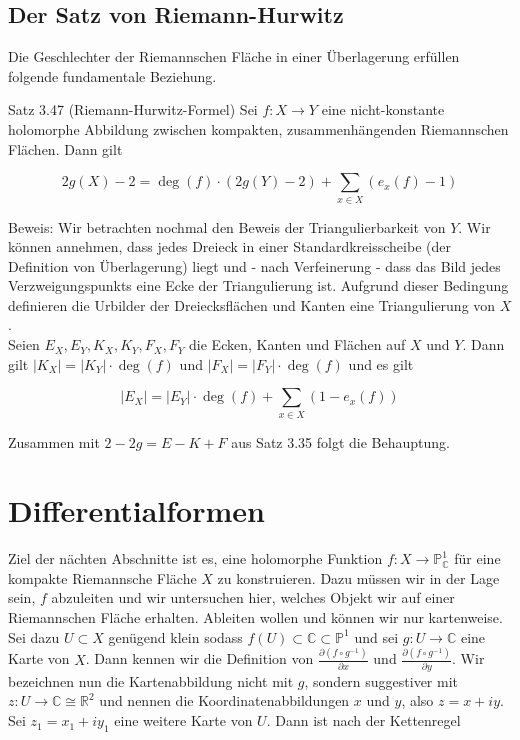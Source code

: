\documentclass[10pt, letterpaper]{article}
\begin{document}
\pagebreak

\subsection {Der Satz von Riemann-Hurwitz}
Die Geschlechter der Riemannschen Fläche in einer Überlagerung erfüllen folgende fundamentale Beziehung.

Satz 3.47 (Riemann-Hurwitz-Formel) Sei $f: X \rightarrow Y$ eine nicht-konstante holomorphe Abbildung zwischen kompakten, zusammenhängenden Riemannschen Flächen. Dann gilt

$$
2 g(X)-2=\operatorname{deg}(f) \cdot(2 g(Y)-2)+\sum_{x \in X}\left(e_{x}(f)-1\right)
$$

Beweis: Wir betrachten nochmal den Beweis der Triangulierbarkeit von $Y$. Wir können annehmen, dass jedes Dreieck in einer Standardkreisscheibe (der Definition von Überlagerung) liegt und - nach Verfeinerung - dass das Bild jedes Verzweigungspunkts eine Ecke der Triangulierung ist. Aufgrund dieser Bedingung definieren die Urbilder der Dreiecksflächen und Kanten eine Triangulierung von $X$.\\
Seien $E_{X}, E_{Y}, K_{X}, K_{Y}, F_{X}, F_{Y}$ die Ecken, Kanten und Flächen auf $X$ und $Y$. Dann gilt $\left|K_{X}\right|=\left|K_{Y}\right| \cdot \operatorname{deg}(f)$ und $\left|F_{X}\right|=\left|F_{Y}\right| \cdot \operatorname{deg}(f)$ und es gilt

$$
\left|E_{X}\right|=\left|E_{Y}\right| \cdot \operatorname{deg}(f)+\sum_{x \in X}\left(1-e_{x}(f)\right)
$$

Zusammen mit $2-2 g=E-K+F$ aus Satz 3.35 folgt die Behauptung.



\pagebreak


\section {Differentialformen}
Ziel der nächten Abschnitte ist es, eine holomorphe Funktion $f: X \longrightarrow \mathbb{P}_{\mathbb{C}}^{1}$ für eine kompakte Riemannsche Fläche $X$ zu konstruieren. Dazu müssen wir in der Lage sein, $f$ abzuleiten und wir untersuchen hier, welches Objekt wir auf einer Riemannschen Fläche erhalten. Ableiten wollen und können wir nur kartenweise. Sei dazu $U \subset X$ genügend klein sodass $f(U) \subset \mathbb{C} \subset \mathbb{P}^{1}$ und sei $g: U \longrightarrow \mathbb{C}$ eine Karte von $X$. Dann kennen wir die Definition von $\frac{\partial\left(f \circ g^{-1}\right)}{\partial x}$ und $\frac{\partial\left(f \circ g^{-1}\right)}{\partial y}$. Wir bezeichnen nun die Kartenabbildung nicht mit $g$, sondern suggestiver mit $z: U \longrightarrow \mathbb{C} \cong \mathbb{R}^{2}$ und nennen die Koordinatenabbildungen $x$ und $y$, also $z=x+i y$. Sei $z_{1}=x_{1}+i y_{1}$ eine weitere Karte von $U$. Dann ist nach der Kettenregel
\end{document}
